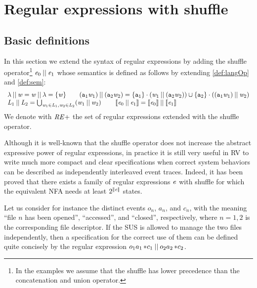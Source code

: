 \section{Regular expressions with shuffle}\label{sec:shuffle}

\subsection{Basic definitions}
In this section we extend the syntax of regular expressions by adding the shuffle operator\footnote{In the examples we assume that the shuffle has lower precedence than the concatenation and union operator.} $\mathit {e}_0\mathbin{||}\mathit {e}_1$ whose semantics is defined as follows by extending \cref{def:langOp} and \cref{def:sem}:
\[
 \begin{array}{l}
  \lambda \mathbin{||} \mathit {w} = \mathit {w} \mathbin{||} \lambda = \{\mathit {w}\}                                                                                                      \qquad
  (\mathtt {a}_1\mathit {w}_1) \mathbin{||} (\mathtt {a}_2\mathit {w}_2) = \{ \mathtt {a}_1  \} \mathbin{\cdot} (\mathit {w}_1 \mathbin{||} (\mathtt {a}_2\mathit {w}_2)) \cup \{\mathtt {a}_2\}\mathbin{\cdot}((\mathtt {a}_1\mathit {w}_1)\mathbin{||}\mathit {w}_2) \\
  \mathit {L}_1\mathbin{||}\mathit {L}_2=\bigcup_{\mathit {w}_1\in\mathit {L}_1,\mathit {w}_2\in\mathit {L}_2}(\mathit {w}_1\mathbin{||}\mathit {w}_2)                                                                     \qquad
  \left\llbracket{\ensuremath{\mathit {e}}_0\mathbin{||}\ensuremath{\mathit {e}}_1}\right\rrbracket=\left\llbracket{\ensuremath{\mathit {e}}_0}\right\rrbracket\mathbin{||}\left\llbracket{\ensuremath{\mathit {e}}_1}\right\rrbracket
 \end{array}
\]
We denote with $\mathit {RE+}$ the set of regular expressions extended with the shuffle operator.

Although it is well-known that the shuffle operator does not increase the abstract expressive power of regular expressions, in practice it is still very useful in RV to write much more compact and clear
specifications when correct system behaviors can be described as independently interleaved event traces. Indeed, it has been proved \cite{BrodaEtAl18,MayerElAl94} that there exists a family of regular expressions $\mathit {e}$ with shuffle for which the equivalent NFA needs at least $2^{{{\mid\!\mid}}{\mathit {e}}{{\mid\!\mid}}}$ states.

Let us consider for instance the distinct events $o_n$, $a_n$, and $c_n$, with the meaning
``file $n$ has been opened'', ``accessed'', and ``closed'', respectively, where $n=1,2$ is the corresponding file descriptor.
If the SUS is allowed to manage the two files independently, then a specification for the correct use of them can be defined quite concisely by the regular expression $o_1{{a_1}\mathop{*}} c_1\mathbin{||} o_2{{a_2}\mathop{*}} c_2$.

